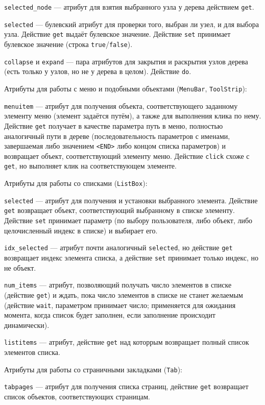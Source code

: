 \documentclass[11pt]{book} %
\begin{document}
\verb|selected_node| --- атрибут для взятия выбранного узла у дерева действием \verb|get|.

\verb|selected| --- булевский атрибут для проверки того, выбран ли узел, и для выбора узла. Действие \verb|get| выдаёт булевское значение. Действие \verb|set| принимает булевское значение (строка \verb|true|/\verb|false|).


\verb|collapse| и \verb|expand| --- пара атрибутов для закрытия и раскрытия узлов дерева (есть только у узлов, но не у дерева в целом). Действие \verb|do|.

Атрибуты для работы с меню и подобными объектами (\verb|MenuBar|, \verb|ToolStrip|):

\verb|menuitem| --- атрибут для получения объекта, соответствующего заданному элементу меню (элемент задаётся путём), а также для выполнения клика по нему. Действие \verb|get| получает в качестве параметра путь в меню, полностью аналогичный пути в дереве (последовательность параметров с именами, завершаемая либо значением \verb|<END>| либо концом списка параметров) и возвращает объект, соответствующий элементу меню. Действие \verb|click| схоже с \verb|get|, но выполняет клик на соответствующем элементе.

Атрибуты для работы со списками (\verb|ListBox|):

\verb|selected| --- атрибут для получения и установки выбранного элемента. Действие \verb|get| возвращает объект, соответствующий выбранному в списке элементу. Действие \verb|set| принимает параметр (по выбору пользователя, либо объект, либо целочисленный индекс в списке) и выбирает его.

\verb|idx_selected| --- атрибут почти аналогичный \verb|selected|, но действие \verb|get| возвращает индекс элемента списка, а действие \verb|set| принимает только индекс, но не объект.

\verb|num_items| --- атрибут, позволяющий получать число элементов в списке (действие \verb|get|) и ждать, пока число элементов в списке не станет желаемым (действие \verb|wait|, параметром принимает число; применяется для ожидания момента, когда список будет заполнен, если заполнение происходит динамически).

\verb|listitems| --- атрибут, действие \verb|get| над которрым возвращает полный список элементов списка.

Атрибуты для работы со страничными закладками (\verb|Tab|):

\verb|tabpages| --- атрибут для получения списка страниц, действие \verb|get| возвращает список объектов, соответствующих страницам.
\end{document}
